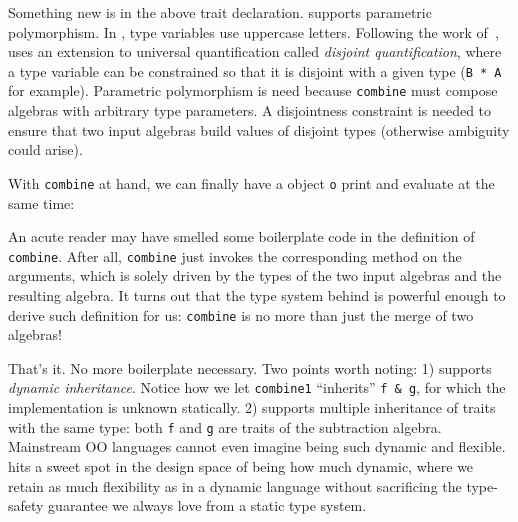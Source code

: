 Something new is in the above trait declaration. \name supports parametric
polymorphism. In \name, type variables use uppercase letters. Following the work
of~\citet{alpuimdisjoint}, \name uses an extension to universal quantification
called \textit{disjoint quantification}, where a type variable can be
constrained so that it is disjoint with a given type (\lstinline{B * A} for
example). Parametric polymorphism is need because \lstinline{combine} must
compose algebras with arbitrary type parameters. A disjointness constraint is
needed to ensure that two input algebras build values of disjoint types
(otherwise ambiguity could arise).

With \lstinline{combine} at hand, we can finally have a object \lstinline{o}
print and evaluate at the same time:


An acute reader may have smelled some boilerplate code in the definition of
\lstinline{combine}. After all, \lstinline{combine} just invokes the
corresponding method on the arguments, which is solely driven by the types of
the two input algebras and the resulting algebra. It turns out that the type
system behind \name is powerful enough to derive such definition for us:
\lstinline{combine} is no more than just the merge of two algebras!


That's it. No more boilerplate necessary. Two points worth noting: 1) \name
supports \textit{dynamic inheritance}. Notice how we let \lstinline{combine1}
``inherits'' \lstinline{f & g}, for which the implementation is unknown
statically. 2) \name supports multiple inheritance of traits with the same type:
both \lstinline{f} and \lstinline{g} are traits of the subtraction algebra.
Mainstream OO languages cannot even imagine being such dynamic and flexible.
\name hits a sweet spot in the design space of being how much dynamic, where we
retain as much flexibility as in a dynamic language without sacrificing the
type-safety guarantee we always love from a static type system.
